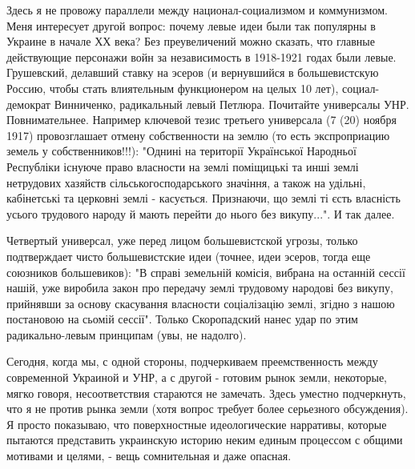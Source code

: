 Здесь я не провожу параллели между национал-социализмом и коммунизмом. Меня
интересует другой вопрос: почему левые идеи были так популярны в Украине в
начале ХХ века? Без преувеличений можно сказать, что главные действующие
персонажи войн за независимость в 1918-1921 годах были левые. Грушевский,
делавший ставку на эсеров (и вернувшийся в большевистскую Россию, чтобы стать
влиятельным функционером на целых 10 лет), социал-демократ Винниченко,
радикальный левый Петлюра. Почитайте универсалы УНР. Повнимательнее. Например
ключевой тезис третьего универсала (7 (20) ноября 1917) провозглашает отмену
собственности на землю (то есть экспроприацию земель у собственников!!!):
"Однині на території Української Народньої Республіки існуюче право власности
на землі поміщицькі та инші землі нетрудових хазяйств сільськогосподарського
значіння, а також на удільні, кабінетські та церковні землі - касується.
Признаючи, що землі ті єсть власність усього трудового народу й мають перейти
до нього без викупу...". И так далее. 

Четвертый универсал, уже перед лицом большевистской угрозы, только подтверждает
чисто большевистские идеи (точнее, идеи эсеров, тогда еще союзников
большевиков): "В справі земельній комісія, вибрана на останній сессії нашій,
уже виробила закон про передачу землі трудовому народові без викупу, прийнявши
за основу скасування власности соціалізацію землі, згідно з нашою постановою на
сьомій сессії". Только Скоропадский нанес удар по этим радикально-левым
принципам (увы, не надолго). 

Сегодня, когда мы, с одной стороны, подчеркиваем преемственность между
современной Украиной и УНР, а с другой - готовим рынок земли, некоторые, мягко
говоря, несоответствия стараются не замечать. Здесь уместно подчеркнуть, что я
не против рынка земли (хотя вопрос требует более серьезного обсуждения). Я
просто показываю, что поверхностные идеологические нарративы, которые пытаются
представить украинскую историю неким единым процессом с общими мотивами и
целями, - вещь сомнительная и даже опасная. 

